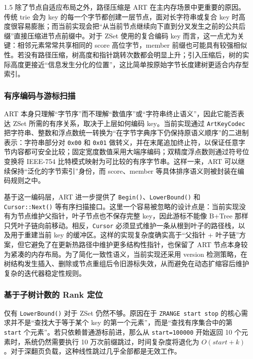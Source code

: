 \documentclass[a4paper,12pt,fontset=none,twoside]{article}
\numberwithin{figure}{section}
\numberwithin{equation}{section}
\numberwithin{table}{section}
\begin{document}
\begin{spacing}{1.5}
	除了节点自适应布局之外，路径压缩是 ART 在主内存场景中更重要的原因。传统 trie 会为 key 的每一个字节都创建一层节点，面对长字符串或复合 key 时高度很容易膨胀；而当前实现会把“从当前节点继续向下直到分叉发生之前的公共后缀”直接压缩进节点前缀中。对于 ZSet 使用的复合编码 key 而言，这一点尤为关键：相邻元素常常共享相同的 score 高位字节，member 前缀也可能具有较强相似性。若没有路径压缩，树高度和指针跳转次数都会明显上升；引入压缩后，树的实际高度更接近“信息发生分化的位置”，这比简单按原始字节长度建树更适合内存型索引。

	\subsubsection{有序编码与游标扫描}

	ART 本身只理解“字节序”而不理解“数值序”或“字符串终止语义”，因此它能否表达 ZSet 所需的有序关系，取决于上层如何编码 key。当前实现通过 \texttt{ArtKeyCodec} 把字符串、整数和浮点数统一转换为“在字节字典序下仍保持原语义顺序”的二进制表示：字符串部分对 \texttt{0x00} 和 \texttt{0x01} 做转义，并在末尾追加终止符，以保证任意字节内容都可安全比较；固定宽度数值采用大端序编码；双精度浮点数则通过符号位变换将 IEEE-754 比特模式映射为可比较的有序字节串。这样一来，ART 可以继续保持“泛化的字节索引”身份，而 score、member 等具体排序语义则被封装在编码规则之中。

	基于这一编码层，ART 进一步提供了 \texttt{Begin()}、\texttt{LowerBound()} 和 \texttt{Cursor::Next()} 等有序扫描接口。这里一个容易被忽略的设计点是：当前实现没有为节点维护父指针，叶子节点也不保存完整 key，因此游标不能像 B+Tree 那样只凭叶子链向前移动。相反，\texttt{Cursor} 必须显式维护一条从根到叶子的路径栈，以及用于重建当前 key 的缓冲区。这样的实现复杂度确实高于“父指针 + 叶子链”方案，但它避免了在更新热路径中维护更多结构性指针，也保留了 ART 节点本身较为紧凑的内存布局。为了简化一致性语义，当前实现还采用 version 检测策略，在树结构发生插入、删除或节点重组后令旧游标失效，从而避免在动态扩缩容后维护复杂的迭代器稳定性规则。

	\subsubsection{基于子树计数的 Rank 定位}

	仅有 \texttt{LowerBound()} 对于 ZSet 仍然不够。原因在于 \texttt{ZRANGE start stop} 的核心需求并不是“查找大于等于某个 key 的第一个元素”，而是“查找有序集合中的第 \texttt{start} 个元素”。若只依赖普通游标前进，那么从 \texttt{start=100000} 开始返回 10 个元素时，系统仍然需要执行 10 万次前缀跳过，时间复杂度将退化为 $O(start + k)$。对于深翻页负载，这种线性跳过几乎全部都是无效工作。


\end{spacing}
\end{document}
